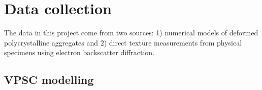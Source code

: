 \documentclass[a4paper,12pt,twoside]{report}
\numberwithin{equation}{chapter}
\begin{document}
\section{Data collection} \label{sec:data}
The data in this project come from two sources: 1) numerical models of deformed polycrystalline aggregates and 2) direct texture measurements from physical specimens using electron backscatter diffraction. 

\subsection{VPSC modelling}
%
%
\end{document}
